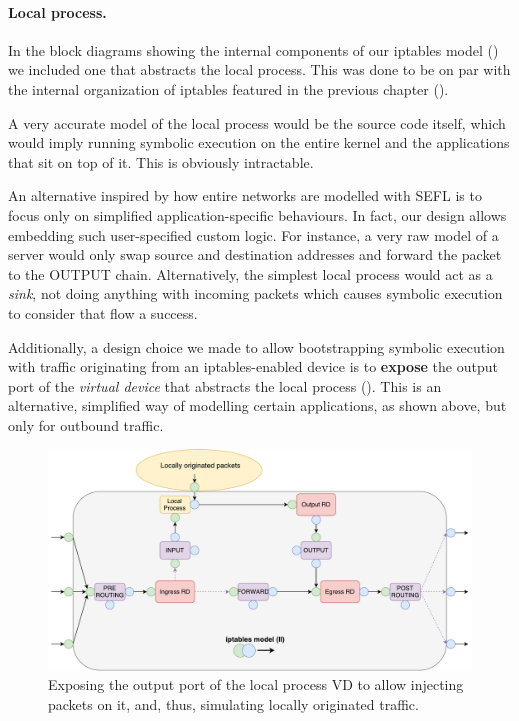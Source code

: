 \paragraph{Local process.}
In the block diagrams showing the internal components of our iptables model
() we included one that abstracts the
local process.  This was done to be on par with the internal organization of
iptables featured in the previous chapter
().

A very accurate model of the local process would be the source code itself,
which would imply running symbolic execution on the entire kernel and the
applications that sit on top of it.  This is obviously intractable.

An alternative inspired by how entire networks are modelled with SEFL is to
focus only on simplified application-specific behaviours.  In fact, our design
allows embedding such user-specified custom logic.  For instance, a very raw
model of a server would only swap source and destination addresses and forward
the packet to the OUTPUT chain.  Alternatively, the simplest local process
would act as a \emph{sink}, not doing anything with incoming packets which
causes symbolic execution to consider that flow a success.

Additionally, a design choice we made to allow bootstrapping symbolic execution
with traffic originating from an iptables-enabled device is to \textbf{expose}
the output port of the \emph{virtual device} that abstracts the local process
().  This is an alternative,
simplified way of modelling certain applications, as shown above, but only for
outbound traffic.

\begin{figure}[h]
  \centering
  \captionsetup{justification=centering}
  \includegraphics[scale=0.4]{src/img/local-process-out}
  \caption[Exposing the output port of the local process VD.]{Exposing the
  output port of the local process VD to allow injecting packets on it, and,
  thus, simulating locally originated traffic.}
  \label{fig:local-process-out}
\end{figure}


